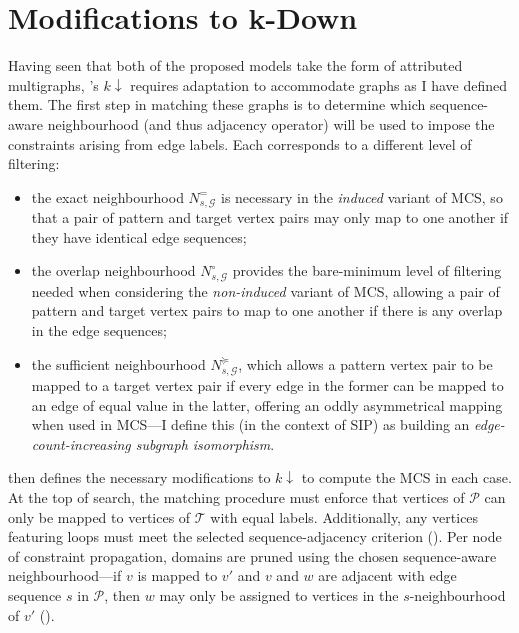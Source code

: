 \documentclass{mpaper}
\begin{document}

\section{Modifications to k-Down}
\label{sec:k-down-mods}

Having seen that both of the proposed models take the form of attributed multigraphs, \citeauthor{Between-MCS-SIP}'s $k\downarrow$ requires adaptation to accommodate graphs as I have defined them.
The first step in matching these graphs is to determine which sequence-aware neighbourhood (and thus adjacency operator) will be used to impose the constraints arising from edge labels.
Each corresponds to a different level of filtering:
\begin{itemize}
	\item the exact neighbourhood $N^{=}_{s,\mathcal{G}}$ is necessary in the \emph{induced} variant of MCS, so that a pair of pattern and target vertex pairs may only map to one another if they have identical edge sequences;
	
	\item the overlap neighbourhood $N^{\circ}_{s,\mathcal{G}}$ provides the bare-minimum level of filtering needed when considering the \emph{non-induced} variant of MCS, allowing a pair of pattern and target vertex pairs to map to one another if there is any overlap in the edge sequences;
	
	\item the sufficient neighbourhood $N^{\succcurlyeq}_{s,\mathcal{G}}$, which allows a pattern vertex pair to be mapped to a target vertex pair if every edge in the former can be mapped to an edge of equal value in the latter, offering an oddly asymmetrical mapping when used in MCS---I define this (in the context of SIP) as building an \emph{edge-count-increasing subgraph isomorphism}.
\end{itemize}

 then defines the necessary modifications to $k\downarrow$ to compute the MCS in each case.
At the top of search, the matching procedure must enforce that vertices of $\mathcal{P}$ can only be mapped to vertices of $\mathcal{T}$ with equal labels.
Additionally, any vertices featuring loops must meet the selected sequence-adjacency criterion ().
Per node of constraint propagation, domains are pruned using the chosen sequence-aware neighbourhood---if $v$ is mapped to $v'$ and $v$ and $w$ are adjacent with edge sequence $s$ in $\mathcal{P}$, then $w$ may only be assigned to vertices in the $s$-neighbourhood of $v'$ ().
\end{document}

